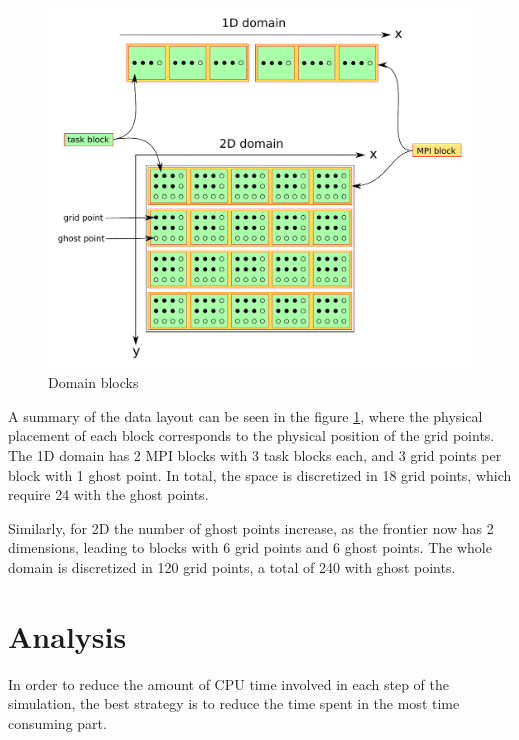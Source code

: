 \documentclass[a4paper]{report}
\begin{document}
\begin{figure}[h]
	\centering
	\includegraphics[width=\linewidth]{domain-blocks.pdf}
	\caption{Domain blocks}
	\label{fig:domain-blocks}
\end{figure}

A summary of the data layout can be seen in the figure \ref{fig:domain-blocks}, 
where the physical placement of each block corresponds to the physical position 
of the grid points. The 1D domain has 2 MPI blocks with 3 task blocks each, and 
3 grid points per block with 1 ghost point. In total, the space is discretized 
	in 18 grid points, which require 24 with the ghost points.

Similarly, for 2D the number of ghost points increase, as the frontier now has 2 
dimensions, leading to blocks with 6 grid points and 6 ghost points. The whole 
domain is discretized in 120 grid points, a total of 240 with ghost points.



\chapter{Analysis}


In order to reduce the amount of CPU time involved in each step of the 
simulation, the best strategy is to reduce the time spent in the most time 
consuming part.
\end{document}
